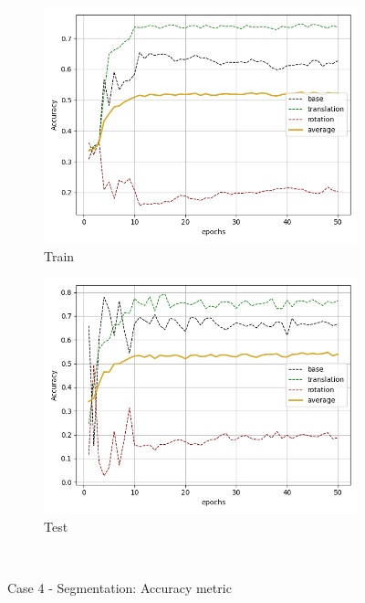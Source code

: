 \begin{figure}[H]
    \begin{subfigure}{.48\linewidth}
    \centering
    \includegraphics[scale=0.45]{Img/seg_flow_noise_train_acc.png}
    \caption{Train}
    \end{subfigure}
    \begin{subfigure}{.48\linewidth}
    \centering
    \includegraphics[scale=0.45]{Img/seg_flow_noise_test_acc.png}
    \caption{Test}
    \end{subfigure}\\
    \caption{Case 4 - Segmentation: Accuracy metric}
    \label{fig:seg_flow_noise_acc}
\end{figure}

